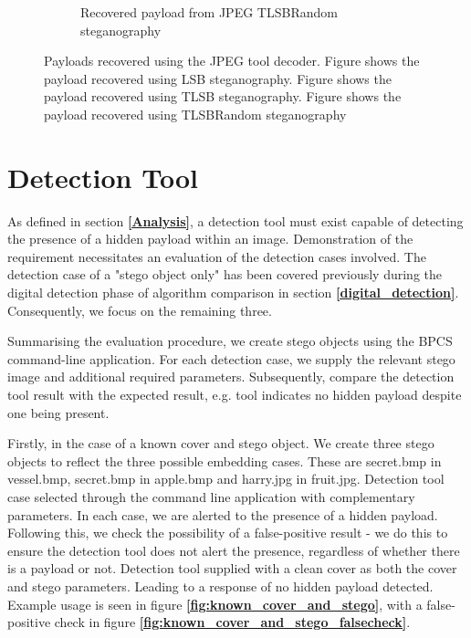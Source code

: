 \documentclass{l4proj}
\begin{document}
\begin{figure}
\begin{subfigure}[b]{0.3\textwidth}
        \caption{Recovered payload from JPEG TLSBRandom steganography}
        \label{fig:jpeg_extracted_LSBRandom}
    \end{subfigure}
    \caption{Payloads recovered using the JPEG tool decoder. Figure  shows the payload recovered using LSB steganography. Figure  shows the payload recovered using TLSB steganography. Figure  shows the payload recovered using TLSBRandom steganography }
    \label{fig:jpeg_payloads}
\end{figure}

\section{Detection Tool}\label{detection_tool_eval}

As defined in section \textbf{\ref{Analysis}}, a detection tool must exist capable of detecting the presence of a hidden payload within an image. Demonstration of the requirement necessitates an evaluation of the detection cases involved.  The detection case of a "stego object only" has been covered previously during the digital detection phase of algorithm comparison in section \textbf{\ref{digital_detection}}. Consequently, we focus on the remaining three.

Summarising the evaluation procedure, we create stego objects using the BPCS command-line application. For each detection case, we supply the relevant stego image and additional required parameters. Subsequently, compare the detection tool result with the expected result, e.g. tool indicates no hidden payload despite one being present.

Firstly, in the case of a known cover and stego object. We create three stego objects to reflect the three possible embedding cases. These are secret.bmp in vessel.bmp, secret.bmp in apple.bmp and harry.jpg in fruit.jpg. Detection tool case selected through the command line application with complementary parameters. In each case, we are alerted to the presence of a hidden payload. Following this, we check the possibility of a false-positive result - we do this to ensure the detection tool does not alert the presence, regardless of whether there is a payload or not. Detection tool supplied with a clean cover as both the cover and stego parameters. Leading to a response of no hidden payload detected. Example usage is seen in figure \textbf{\ref{fig:known_cover_and_stego}}, with a false-positive check in figure \textbf{\ref{fig:known_cover_and_stego_falsecheck}}.
\end{document}
